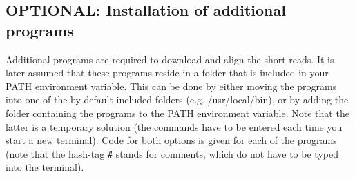 \documentclass[a4paper,10pt]{article}
\begin{document}
\subsection{OPTIONAL: Installation of additional programs}
Additional programs are required to download and align the short reads. It is later assumed that these programs reside in a folder that is included in your PATH environment variable. This can be done by either moving the programs into one of the by-default included folders (e.g. /usr/local/bin), or by adding the folder containing the programs to the PATH environment variable. Note that the latter is a temporary solution (the commands have to be entered each time you start a new terminal). Code for both options is given for each of the programs (note that the hash-tag \texttt{\#} stands for comments, which do not have to be typed into the terminal).
\end{document}
